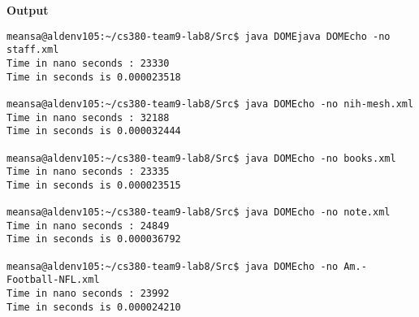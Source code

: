 \documentclass[11pt,english]{article}
\begin{document}
\begin{enumerate}
\textbf{Output}

\begin{lstlisting}
meansa@aldenv105:~/cs380-team9-lab8/Src$ java DOMEjava DOMEcho -no staff.xml
Time in nano seconds : 23330
Time in seconds is 0.000023518

meansa@aldenv105:~/cs380-team9-lab8/Src$ java DOMEcho -no nih-mesh.xml
Time in nano seconds : 32188
Time in seconds is 0.000032444    

meansa@aldenv105:~/cs380-team9-lab8/Src$ java DOMEcho -no books.xml
Time in nano seconds : 23335
Time in seconds is 0.000023515

meansa@aldenv105:~/cs380-team9-lab8/Src$ java DOMEcho -no note.xml
Time in nano seconds : 24849
Time in seconds is 0.000036792

meansa@aldenv105:~/cs380-team9-lab8/Src$ java DOMEcho -no Am.-Football-NFL.xml
Time in nano seconds : 23992
Time in seconds is 0.000024210


\end{lstlisting}
\end{enumerate}
\end{document}
